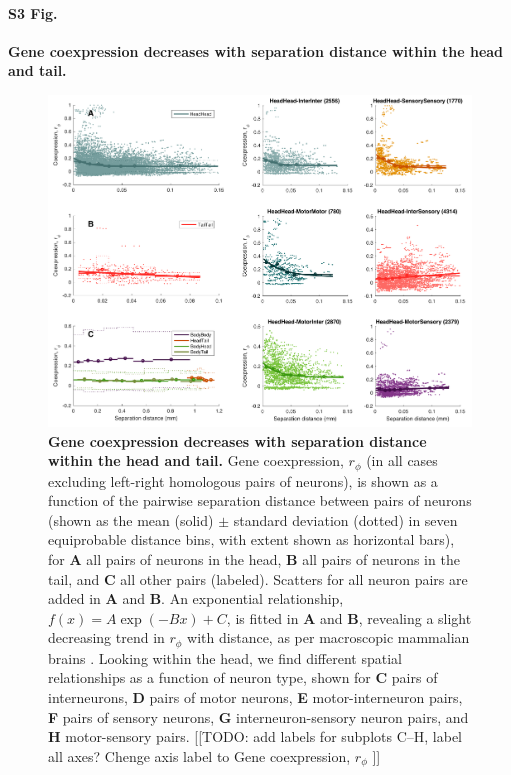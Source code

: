 \documentclass[10pt,letterpaper]{article}
\begin{document}
\paragraph*{S3 Fig.}
{\bf Gene coexpression decreases with separation distance within the head and tail.}
\begin{figure}[h]
\centering
    \includegraphics[width=1\textwidth]{DistanceCoexpression.pdf}
\caption{
\label{fig:S_distCoexp}
\textbf{Gene coexpression decreases with separation distance within the head and tail.}
Gene coexpression, $r_\phi$ (in all cases excluding left-right homologous pairs of neurons), is shown as a function of the pairwise separation distance between pairs of neurons (shown as the mean (solid) $\pm$ standard deviation (dotted) in seven equiprobable distance bins, with extent shown as horizontal bars), for \textbf{A} all pairs of neurons in the head, \textbf{B} all pairs of neurons in the tail, and \textbf{C} all other pairs (labeled).
Scatters for all neuron pairs are added in \textbf{A} and \textbf{B}.
An exponential relationship, $f(x) = A\exp(-Bx)+C$, is fitted in \textbf{A} and \textbf{B}, revealing a slight decreasing trend in $r_\phi$ with distance, as per macroscopic mammalian brains \cite{Fulcher:2016ck, Krienen:2016eq}.
Looking within the head, we find different spatial relationships as a function of neuron type, shown for \textbf{C} pairs of interneurons, \textbf{D} pairs of motor neurons, \textbf{E} motor-interneuron pairs, \textbf{F} pairs of sensory neurons, \textbf{G} interneuron-sensory neuron pairs, and \textbf{H} motor-sensory pairs.
[[TODO: add labels for subplots C--H, label all axes? Chenge axis label to Gene coexpression, $r_\phi$ ]]
}
\end{figure}
\end{document}
